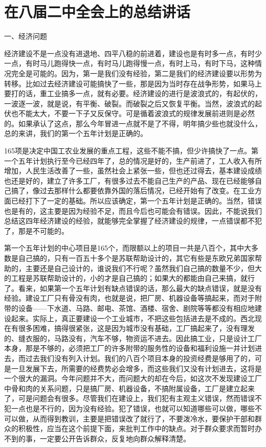 \section[在八届二中全会上的总结讲话（一九五六年十一月十五日）]{在八届二中全会上的总结讲话}


一、经济问题

经济建设不是一点没有进退地、四平八稳的前进着，建设也是有时多一点，有时少一点，有时马儿跑得快一点，有时马儿跑得慢一点，有时上马，有时下马，这种情况完全是可能的。因为，第一是我们没有经验，第二是我们的经济建设要以形势为转移。比如过去经济建设可能搞快了一些，那是因为当时存在战争形势，如果马上要打的话，重工业搞多一点，就有必要。经济建设的进行是波浪式的，有起伏的，一波逐一波，就是说，有平衡、破裂。而破裂之后又恢复平衡。当然，波浪式的起伏也不能太大，不要一下子又反保守。可是循着波浪式的规律发展前进则是必然的。如果承认了这点，那么今年冒进一点就不是了不得，明年搞少些也就没什么，总的来讲，我们的第一个五年计划是正确的。

165项是决定中国工农业发展的重点工程，这些不能不搞，但少许搞快了一点。第一个五年计划执行至今已经四年了，总的情况是好的，生产前进了，工人收入有所增加，人民生活改善了一些，虽然社会上紧张一些，但也还过得去，基本建设成绩也还是好的，建立了许多工厂，有很多过去不能自己生产的产品、现在已经能够自己搞了，像过去那样什么都要依靠外国的落后情况，已经开始有了改变。在工业方面已经打下了一定的基础。所以应该确定，第一个五年计划是正确的。当然，错误也是有的，这主要是因为经验不足，而且今后也可能会有错误。因此，不能说我们总结这四年经济建设的经验，就能够完全掌握了经济建设的规律，一点错误都不犯了，那是不可能的。

第一个五年计划的中心项目是165个，而限额以上的项目一共是八百个，其中大多数是自己搞的，只有一百五十多个是苏联帮助设计的，其它有些是东欧兄弟国家帮助的，主要还是自己设计的，谁说我们不行呢？虽然我们自己搞的数量不少，但大的工程是苏联帮助设计的，小的才是自己搞的；如果大的都能由自己来搞，就行了。看来，如果第一个五年计划有缺点错误的话，那么最大的缺点错误，就是没有经验。建设工厂只有骨没有肉，也就是说，把厂房、机器设备等搞起来，而对于附带的设备——下水道、马路、邮电、茶馆、酒楼、宿舍、剧院等等都没有相应地建设起来。实际上，真正要建设一个工业城市，不把这些包括进去是不成的。西北现在有很多困难，搞得很紧张，这是因为城市没有基础，工厂搞起来了，没有理发的、缝衣服的，马路没有，汽车不够，物资运不进去。因此搞工业，只是设计工厂本身，那是不够的，必须把工厂的许多附带的服务性的设备和福利设施一并计划进去，而过去我们没有列入计划。我们的八百个项目本身的投资经费是够用了的，可是一旦发展下去，所需要的经费势必会增多，而这些我们又没有计划进去，这将是一个很大的漏洞。今年问题并不大，而问题大的却在今后，如这次不发现建设工厂中骨和肉的关系问题，只是搞厂房、机器设备，不搞附属设备，工厂是建立起来了，可是问题会有很多。尽管我们在建设上，我们犯有主观主义错误，然而错误不犯一点也是不行的，因为没有经验。犯了错误，也就可以知道哪些可以做，哪些不可以做，从而得到教训，主要是把错误改了就行了，不要泼冷水，要保护干部和群众的积极性，应当在这个前提下面，来批判工作中的缺点。对于群众要求而暂时办不到的事，一定要公开告诉群众，反复地向群众解释清楚。


